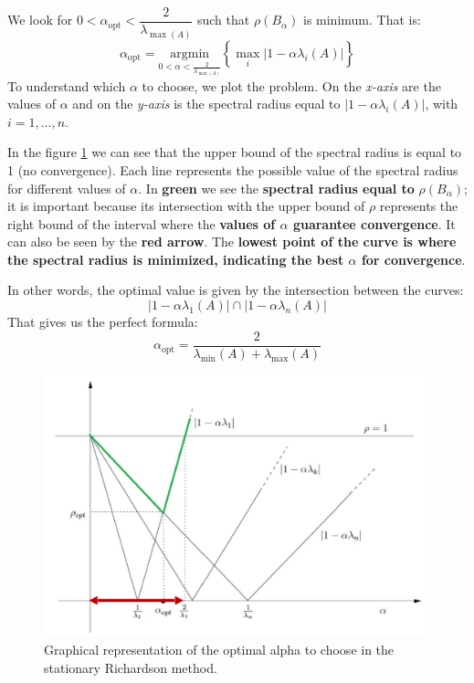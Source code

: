 We look for $0 < \alpha_{\text{opt}} < \dfrac{2}{\lambda_{\max\left(A\right)}}$ such that $\rho\left(B_{\alpha}\right)$ is minimum. That is:
\begin{equation*}
    \alpha_{\text{opt}} = \underset{0 < \alpha < \frac{2}{\lambda_{\max\left(A\right)}}}{\mathrm{argmin}} \left\{\underset{i}{\max} \left|1 - \alpha\lambda_{i}\left(A\right)\right|\right\}
\end{equation*}
To understand which $\alpha$ to choose, we plot the problem. On the \emph{x-axis} are the values of $\alpha$ and on the \emph{y-axis} is the spectral radius equal to $\left|1-\alpha\lambda_{i}\left(A\right)\right|$, with $i = 1, \dots, n$.

\highspace
In the figure \ref{fig: alpha stationary Richardson method} we can see that the upper bound of the spectral radius is equal to 1 (no convergence). Each line represents the possible value of the spectral radius for different values of $\alpha$. In \textbf{green} we see the \textbf{spectral radius equal to} $\rho\left(B_{\alpha}\right)$; it is important because its intersection with the upper bound of $\rho$ represents the right bound of the interval where the \textbf{values of $\alpha$ guarantee convergence}. It can also be seen by the \textbf{red arrow}. The \textbf{lowest point of the curve is where the spectral radius is minimized, indicating the best $\alpha$ for convergence}.

\highspace
In other words, the optimal value is given by the intersection between the curves:
\begin{equation*}
    \left|1 - \alpha \lambda_{1}\left(A\right)\right|
    \cap
    \left|1 - \alpha \lambda_{n}\left(A\right)\right|
\end{equation*}
That gives us the perfect formula:
\begin{equation}
    \alpha_{\text{opt}} = \dfrac{2}{\lambda_{\min}\left(A\right) + \lambda_{\max}\left(A\right)}
\end{equation}
\begin{figure}[!htp]
    \centering
    \includegraphics[width=\textwidth]{img/richardson-alpha-opt-1.pdf}
    \caption{Graphical representation of the optimal alpha to choose in the stationary Richardson method.}
    \label{fig: alpha stationary Richardson method}
\end{figure}

